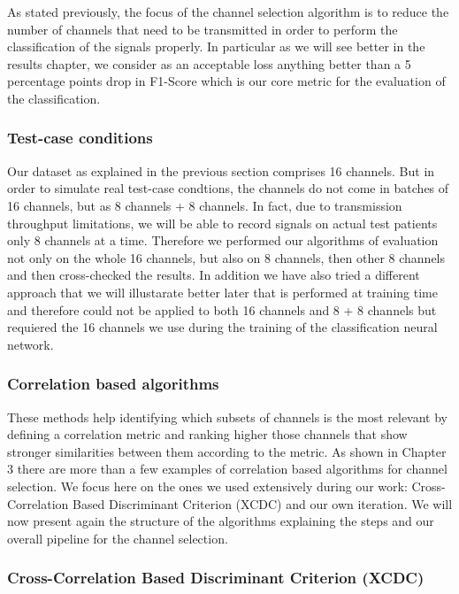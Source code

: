 \documentclass{Configuration_Files/PoliMi3i_thesis}
\begin{document}
As stated previously, the focus of the channel selection algorithm is to reduce the number of channels that need to be transmitted in order to perform the classification of the signals properly.
In particular as we will see better in the results chapter, we consider as an acceptable loss anything better than a 5 percentage points drop in F1-Score which is our core metric for the evaluation of the classification.

\subsubsection{Test-case conditions}

Our dataset as explained in the previous section comprises 16 channels.
But in order to simulate real test-case condtions, the channels do not come in batches of 16 channels, but as 8 channels + 8 channels.
In fact, due to transmission throughput limitations, we will be able to record signals on actual test patients only 8 channels at a time.
Therefore we performed our algorithms of evaluation not only on the whole 16 channels, but also on 8 channels, then other 8 channels and then cross-checked the results.
In addition we have also tried a different approach that we will illustarate better later that is performed at training time and therefore could not be applied to both 16 channels and 8 + 8 channels but requiered the 16 channels we use during the training of the classification neural network.

\subsubsection{Correlation based algorithms}

These methods help identifying which subsets of channels is the most relevant by defining a correlation metric and ranking higher those channels that show stronger similarities between them according to the metric.
As shown in Chapter 3 there are more than a few examples of correlation based algorithms for channel selection.
We focus here on the ones we used extensively during our work: Cross-Correlation Based Discriminant Criterion (XCDC) and our own iteration.
We will now present again the structure of the algorithms explaining the steps and our overall pipeline for the channel selection.

\subsubsection{Cross-Correlation Based Discriminant
Criterion (XCDC)}
\end{document}
